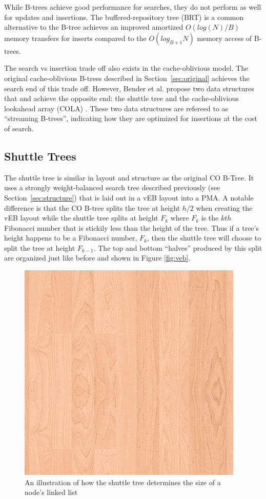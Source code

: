 \documentclass{style}
\begin{document}
While B-trees achieve good performance for searches, they do not perform as
well for updates and insertions. The buffered-repository tree (BRT) is a
common alternative to the B-tree achieves an improved amortized $O(log(N)/B)$
memory transfers for inserts compared to the $O(log_{B+1}N)$ memory access of
B-trees.

The search vs insertion trade off also exists in the cache-oblivious model.
The original cache-oblivious B-trees described in Section~\ref{sec:original}
achieves the search end of this trade off. However, Bender et al. propose two
data structures that and achieve the opposite end: the shuttle tree and the
cache-oblivious lookahead array (COLA) \cite{BenderFaFi07}. These two data
structures are refereed to as ``streaming B-trees'', indicating how they are
optimized for insertions at the cost of search.

\subsection{Shuttle Trees}

The shuttle tree is similar in layout and structure as the original CO B-Tree.
It uses a strongly weight-balanced search tree described previously (see
Section~\ref{sec:structure}) that is laid out in a vEB layout into a PMA. A
notable difference is that the CO B-tree splits the tree at height $h/2$ when
creating the vEB layout while the shuttle tree splits at height $F_k$ where
$F_k$ is the $kth$ Fibonacci number that is stickily less than the height of
the tree. Thus if a tree's height happens to be a Fibonacci number, $F_k$,
then the shuttle tree will choose to split the tree at height $F_{k-1}$. The
top and bottom ``halves'' produced by this split are organized just like
before and shown in Figure \ref{fig:veb}.

\begin{figure}

\begin{center}
	\includegraphics[width=0.8\columnwidth]{figures/veb.png}
\end{center}

\caption{An illustration of how the shuttle tree determines the size of a node's linked list}
\label{fig:buffers}
\end{figure}
\end{document}
